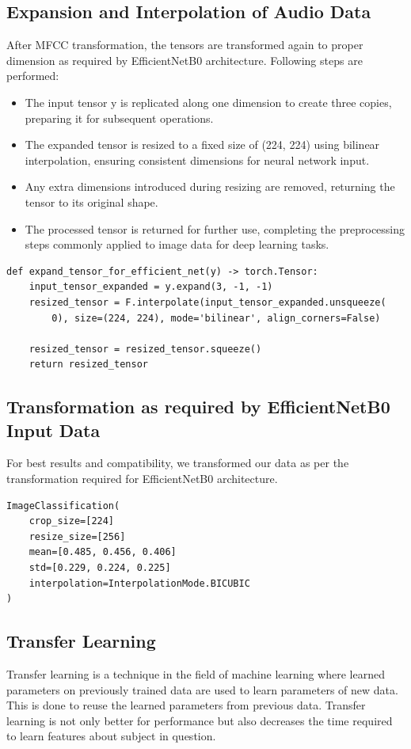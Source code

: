 \documentclass[fleqn, 10pt, twoside]{IOEGC}
\begin{document}
\subsection{Expansion and Interpolation of Audio Data}
After MFCC transformation, the tensors are transformed again to proper dimension as required by EfficientNetB0 architecture. Following steps are performed:
\begin{itemize}
	\item The input tensor y is replicated along one dimension to create three copies, preparing it for subsequent operations.
	\item The expanded tensor is resized to a fixed size of (224, 224) using bilinear interpolation, ensuring consistent dimensions for neural network input.
	\item Any extra dimensions introduced during resizing are removed, returning the tensor to its original shape.
	\item The processed tensor is returned for further use, completing the preprocessing steps commonly applied to image data for deep learning tasks.
\end{itemize}
\begin{lstlisting}[style=mystyle,caption={MFCC Transformation Function},captionpos=b]
def expand_tensor_for_efficient_net(y) -> torch.Tensor:
    input_tensor_expanded = y.expand(3, -1, -1)
    resized_tensor = F.interpolate(input_tensor_expanded.unsqueeze(
        0), size=(224, 224), mode='bilinear', align_corners=False)

    resized_tensor = resized_tensor.squeeze()
    return resized_tensor
\end{lstlisting}

\subsection{Transformation as required by EfficientNetB0 Input Data}
For best results and compatibility, we transformed our data as per the transformation required for EfficientNetB0 architecture.
\begin{lstlisting}[style=mystyle,caption={MFCC Transformation Function},captionpos=b]
ImageClassification(
    crop_size=[224]
    resize_size=[256]
    mean=[0.485, 0.456, 0.406]
    std=[0.229, 0.224, 0.225]
    interpolation=InterpolationMode.BICUBIC
)
\end{lstlisting}

\subsection{Transfer Learning}
Transfer learning is a technique in the field of machine learning where learned parameters on previously trained data are used to learn parameters of new data. This is done to reuse the learned parameters from previous data. Transfer learning is not
only better for performance but also decreases the time required to learn features about
subject in question.
\end{document}
